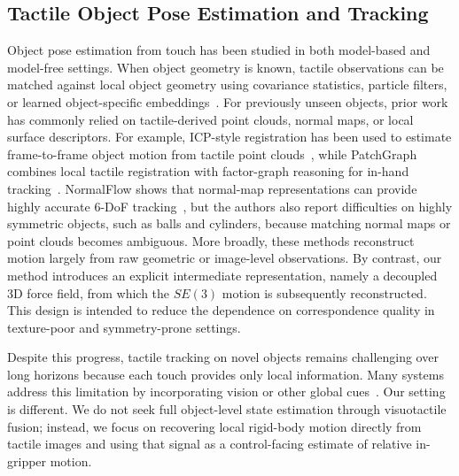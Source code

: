 \documentclass[letterpaper,10pt,journal,twoside]{IEEEtran}
\begin{document}
\subsection{Tactile Object Pose Estimation and Tracking}
Object pose estimation from touch has been studied in both model-based and model-free settings. When object geometry is known, tactile observations can be matched against local object geometry using covariance statistics, particle filters, or learned object-specific embeddings~\cite{bimbo16,suresh22midas,bauza23}. For previously unseen objects, prior work has commonly relied on tactile-derived point clouds, normal maps, or local surface descriptors. For example, ICP-style registration has been used to estimate frame-to-frame object motion from tactile point clouds~\cite{wang21_1,chen91}, while PatchGraph combines local tactile registration with factor-graph reasoning for in-hand tracking~\cite{sodhi22}. NormalFlow shows that normal-map representations can provide highly accurate 6-DoF tracking~\cite{huang24}, but the authors also report difficulties on highly symmetric objects, such as balls and cylinders, because matching normal maps or point clouds becomes ambiguous. More broadly, these methods reconstruct motion largely from raw geometric or image-level observations. By contrast, our method introduces an explicit intermediate representation, namely a decoupled 3D force field, from which the $SE(3)$ motion is subsequently reconstructed. This design is intended to reduce the dependence on correspondence quality in texture-poor and symmetry-prone settings.

Despite this progress, tactile tracking on novel objects remains challenging over long horizons because each touch provides only local information. Many systems address this limitation by incorporating vision or other global cues~\cite{dikhale2022visuotactile,suresh24,li25}. Our setting is different. We do not seek full object-level state estimation through visuotactile fusion; instead, we focus on recovering local rigid-body motion directly from tactile images and using that signal as a control-facing estimate of relative in-gripper motion.

\end{document}

